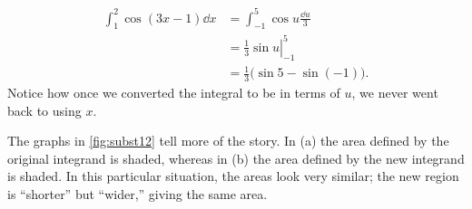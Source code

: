 \begin{example}
\begin{align*}
	\int_1^2 \cos(3x-1) \dd x
	&= \int_{-1}^5 \cos u \frac{\dd u}{3} \\
	&= \left.\frac{1}{3} \sin u\right|_{-1}^5 \\
	&= \frac{1}{3}\bigl(\sin 5- \sin (-1)\bigr).%
\end{align*}
Notice how once we converted the integral to be in terms of $u$, we never went back to using $x$.

The graphs in \autoref{fig:subst12} tell more of the story. In (a) the area defined by the original integrand is shaded, whereas in (b) the area defined by the new integrand is shaded. In this particular situation, the areas look very similar; the new region is ``shorter'' but ``wider,'' giving the same area.
\end{example}

